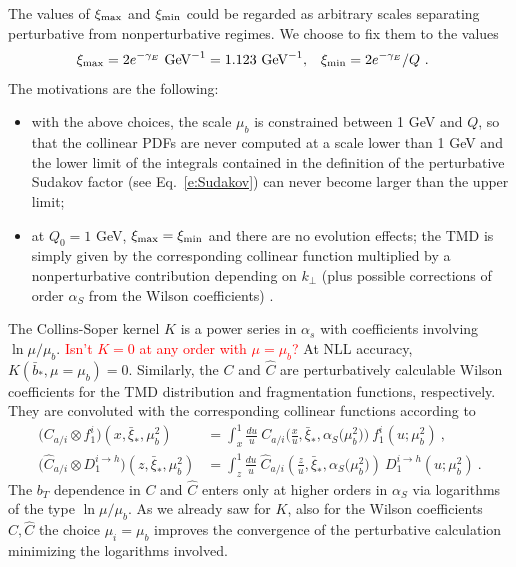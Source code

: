 \documentclass[aps,preprintnumbers,showpacs,nofootinbib,superscriptaddress,floatfix]{revtex4}
\newcommand{\AS}[1]{{\textcolor[rgb]{1,0,1}{#1}}}
\newcommand{\T}{\perp}
\newcommand{\bb}{\xi}
\begin{document}
The values of $\bb_{\rm max}$ and
$\bb_{\rm min}$ could
be regarded as arbitrary scales separating perturbative from nonperturbative
regimes. 
We choose to fix them to the
values 
\begin{align}
\bb_{\rm max} &= 2 e^{-\gamma_E}  \text{  GeV}^{-1} = 1.123 \text{  GeV}^{-1}, 
&
\bb_{\rm min} &= 2 e^{-\gamma_E}/Q \ .
\label{e:bminmax}
\end{align} 
The motivations are the following: 
\begin{itemize}
\item{} with the above choices, the scale $\mu_b$ is
  constrained between 1 GeV and $Q$, so that the collinear PDFs are never
  computed at a scale lower than 1 GeV and the lower limit of the integrals
  contained in the definition of the perturbative Sudakov factor (see
  Eq.~\eqref{e:Sudakov})  can never
  become larger than the upper limit;
\item{} at $Q_0 = 1$ GeV, $\bb_{\rm max} = \bb_{\rm min}$ and there are no evolution effects; the TMD is
simply given by the corresponding collinear function multiplied by a
nonperturbative contribution depending on $k_\T$ (plus possible corrections of
order $\alpha_S$ from the Wilson coefficients) .
\end{itemize} 

The Collins-Soper kernel $K$ is a power series in $\alpha_s$ with coefficients
involving $\ln \mu/\mu_b$. \textcolor{red}{Isn't $K=0$ at any order with $\mu=\mu_b$?} 
At NLL accuracy, $K(\bar{b}_{\ast},\mu=\mu_b) =
0$. 
Similarly, the $C$ and $\hat{C}$ are perturbatively calculable Wilson
coefficients for 
the TMD distribution and fragmentation functions, respectively. They are
convoluted with the corresponding collinear functions according to 
\begin{align}
\bigl( C_{a/i} \otimes f_1^i \bigr) (x, \bar{\bb}_\ast, \mu_b^2) &=
  \int_x^1 \frac{du}{u}\  
        C_{a/i} \Big( \frac{x}{u}, \bar{\bb}_\ast, \alpha_S\big(\mu_b^2\big)  \Big) \  
        f_1^i (u; \mu_b^2) \  , 
\label{e:WC1} \\
\bigl( \hat{C}_{a/i} \otimes D_1^{i\to h} \bigr) (z, \bar{\bb}_\ast, \mu_b^2) &= \int_z^1 \frac{du}{u}\  \hat{C}_{a/i} \left( \frac{z}{u}, \bar{\bb}_\ast, \alpha_S\big(\mu_b^2\big) \right) \  D_1^{i\to h} (u; \mu_b^2) \  . 
\label{e:WC2}
\end{align}
\AS{The $b_T$ dependence in $C$ and $\hat{C}$ enters only at higher orders in $\alpha_S$ via logarithms of the type $\ln \mu/\mu_b$. 
As we already saw for $K$, also for the Wilson coefficients $C,\hat{C}$ the choice $\mu_i=\mu_b$ improves the convergence of the perturbative calculation minimizing the logarithms involved.} 
\end{document}
